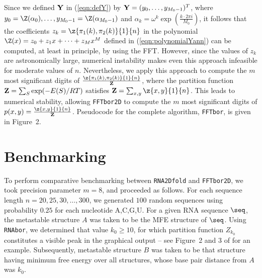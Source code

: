 Since we defined $\bf Y$ in (\ref{eqn:defY}) by ${\bf Y} =
(y_0,\ldots,y_{M_0-1})^T$, where
$y_0=\Z(\alpha_0),\ldots, y_{M_0-1}=\Z(\alpha_{M_0-1})$ and $\alpha_k = \omega^k
\exp(\frac{k \cdot 2\pi i}{M_0})$,
it follows that the coefficients
$z_k=\z{\pi_1(k),\pi_2(k)}{1}{n}$ in the polynomial
$\Z(x) = z_0 + z_1 x + \cdots + z_{M} x^{M}$ defined in
(\ref{eqn:polynomialYann}) can be computed, at least in principle,
by using the FFT. However, since the values of
$z_{k}$ are astronomically large, numerical
instability makes even this approach infeasible for moderate values of $n$.
Nevertheless, we apply this approach to compute the $m$ most significant
digits of $\frac{\z{\pi_1(k),\pi_2(k)}{1}{n}}{{\bf Z}}$,
where the partition function ${\bf Z} = \sum_{S} \exp(-E(S)/RT)$ satisfies
${{\bf Z}} = \sum_{x,y} \z{x,y}{1}{n}$. This leads to numerical stability,
allowing {\tt FFTbor2D} to compute the
$m$ most significant digits of $p(x,y) = \frac{\z{x,y}{1}{n}}{{\bf Z}}$.
Pseudocode for the complete algorithm, {\tt FFTbor}, is given in
Figure~2.


\section{Benchmarking}
\label{section:benchmarking}

To perform comparative benchmarking between {\tt RNA2Dfold} and {\tt FFTbor2D},
we took precision parameter $m=8$, and proceeded as follows.
For each sequence length $n = 20,25,30,\ldots,300$, we generated
$100$ random sequences using probability $0.25$ for each nucleotide A,C,G,U.
For a given RNA sequence $\seq$, the metastable structure $A$ was
taken to be the MFE structure of $\seq$.
Using {\tt RNAbor}, we determined that value $k_0\geq 10$, for which
partition function $Z_{k_0}$ constitutes a visible peak in the graphical
output -- see Figure~2 and 3 of  \cite{Freyhult.b07} for an example.
Subsequently, metastable structure $B$ was taken to be that structure
having minimum free energy over all structures, whose base pair distance from
$A$ was $k_0$.

